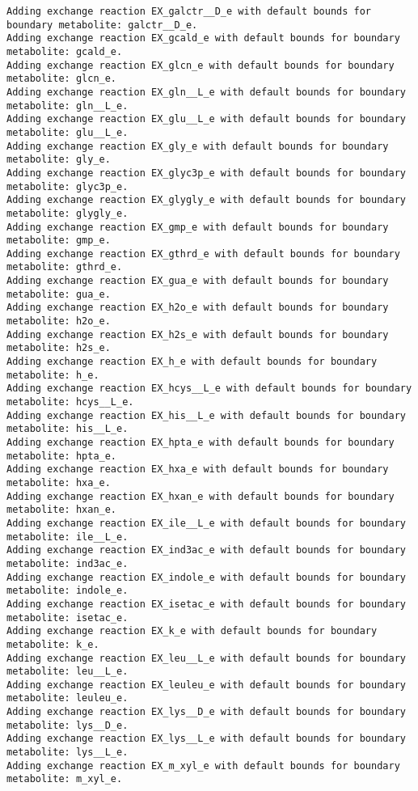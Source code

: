\documentclass[
  letterpaper,
  DIV=11,
  numbers=noendperiod]{scrartcl}
\begin{document}
\begin{verbatim}
Adding exchange reaction EX_galctr__D_e with default bounds for boundary metabolite: galctr__D_e.
Adding exchange reaction EX_gcald_e with default bounds for boundary metabolite: gcald_e.
Adding exchange reaction EX_glcn_e with default bounds for boundary metabolite: glcn_e.
Adding exchange reaction EX_gln__L_e with default bounds for boundary metabolite: gln__L_e.
Adding exchange reaction EX_glu__L_e with default bounds for boundary metabolite: glu__L_e.
Adding exchange reaction EX_gly_e with default bounds for boundary metabolite: gly_e.
Adding exchange reaction EX_glyc3p_e with default bounds for boundary metabolite: glyc3p_e.
Adding exchange reaction EX_glygly_e with default bounds for boundary metabolite: glygly_e.
Adding exchange reaction EX_gmp_e with default bounds for boundary metabolite: gmp_e.
Adding exchange reaction EX_gthrd_e with default bounds for boundary metabolite: gthrd_e.
Adding exchange reaction EX_gua_e with default bounds for boundary metabolite: gua_e.
Adding exchange reaction EX_h2o_e with default bounds for boundary metabolite: h2o_e.
Adding exchange reaction EX_h2s_e with default bounds for boundary metabolite: h2s_e.
Adding exchange reaction EX_h_e with default bounds for boundary metabolite: h_e.
Adding exchange reaction EX_hcys__L_e with default bounds for boundary metabolite: hcys__L_e.
Adding exchange reaction EX_his__L_e with default bounds for boundary metabolite: his__L_e.
Adding exchange reaction EX_hpta_e with default bounds for boundary metabolite: hpta_e.
Adding exchange reaction EX_hxa_e with default bounds for boundary metabolite: hxa_e.
Adding exchange reaction EX_hxan_e with default bounds for boundary metabolite: hxan_e.
Adding exchange reaction EX_ile__L_e with default bounds for boundary metabolite: ile__L_e.
Adding exchange reaction EX_ind3ac_e with default bounds for boundary metabolite: ind3ac_e.
Adding exchange reaction EX_indole_e with default bounds for boundary metabolite: indole_e.
Adding exchange reaction EX_isetac_e with default bounds for boundary metabolite: isetac_e.
Adding exchange reaction EX_k_e with default bounds for boundary metabolite: k_e.
Adding exchange reaction EX_leu__L_e with default bounds for boundary metabolite: leu__L_e.
Adding exchange reaction EX_leuleu_e with default bounds for boundary metabolite: leuleu_e.
Adding exchange reaction EX_lys__D_e with default bounds for boundary metabolite: lys__D_e.
Adding exchange reaction EX_lys__L_e with default bounds for boundary metabolite: lys__L_e.
Adding exchange reaction EX_m_xyl_e with default bounds for boundary metabolite: m_xyl_e.

\end{verbatim}
\end{document}
